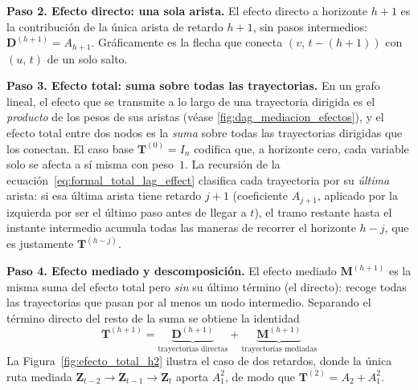 \documentclass[12pt]{report} %
\begin{document}
\begin{figure}[H]
{
    }
\end{figure}

\textbf{Paso 2. Efecto directo: una sola arista.} El efecto directo a horizonte $h+1$ es la contribución de la única arista de retardo $h+1$, sin pasos intermedios: $\mathbf{D}^{(h+1)} = A_{h+1}$. Gráficamente es la flecha que conecta $(v,\, t-(h+1))$ con $(u,\, t)$ de un solo salto.

\textbf{Paso 3. Efecto total: suma sobre todas las trayectorias.} En un grafo lineal, el efecto que se transmite a lo largo de una trayectoria dirigida es el \emph{producto} de los pesos de sus aristas (véase \ref{fig:dag_mediacion_efectos}), y el efecto total entre dos nodos es la \emph{suma} sobre todas las trayectorias dirigidas que los conectan. El caso base $\mathbf{T}^{(0)} = I_n$ codifica que, a horizonte cero, cada variable solo se afecta a sí misma con peso~$1$. La recursión de la ecuación~\eqref{eq:formal_total_lag_effect} clasifica cada trayectoria por su \emph{última} arista: si esa última arista tiene retardo $j+1$ (coeficiente $A_{j+1}$, aplicado por la izquierda por ser el último paso antes de llegar a $t$), el tramo restante hasta el instante intermedio acumula todas las maneras de recorrer el horizonte $h-j$, que es justamente $\mathbf{T}^{(h-j)}$.

\textbf{Paso 4. Efecto mediado y descomposición.} El efecto mediado $\mathbf{M}^{(h+1)}$ es la misma suma del efecto total pero \emph{sin} su último término (el directo): recoge todas las trayectorias que pasan por al menos un nodo intermedio. Separando el término directo del resto de la suma se obtiene la identidad
$$\mathbf{T}^{(h+1)} = \underbrace{\mathbf{D}^{(h+1)}}_{\text{trayectorias directas}} + \underbrace{\mathbf{M}^{(h+1)}}_{\text{trayectorias mediadas}}$$
La Figura~\ref{fig:efecto_total_h2} ilustra el caso de dos retardos, donde la única ruta mediada $\mathbf{Z}_{t-2} \to \mathbf{Z}_{t-1} \to \mathbf{Z}_t$ aporta $A_1^2$, de modo que $\mathbf{T}^{(2)} = A_2 + A_1^2$.
\end{document}
